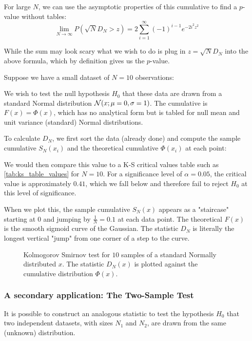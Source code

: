 For large $N$, we can use the asymptotic properties of this cumulative to find a $p$-value without tables:
	\[
	\lim_{N\to\infty} P\left(\sqrt{N}D_N>z\right) = 2\sum_{i=1}^\infty \left(-1\right)^{i-1}e^{-2i^2z^2}
	\]

While the sum may look scary what we wish to do is plug in $z= \sqrt{N}D_N$ into the above formula, which by definition gives us the $p$-value.

\begin{example}
	Suppose we have a small dataset of $N=10$ observations:
	
	
		
	We wish to test the null hypothesis $H_0$ that these data are drawn from a standard Normal distribution $\mathcal{N}(x;\mu=0, \sigma=1)$. The cumulative is $F(x) = \Phi(x)$, which has no analytical form but is tabled for null mean and unit variance (standard) Normal distributions.

	To calculate $D_N$, we first sort the data (already done) and compute the sample cumulative $S_N(x_i)$ and the theoretical cumulative $\Phi(x_i)$ at each point:
	
	
	
	We would then compare this value to a K-S critical values table such as \ref{tab:ks_table_values} for $N=10$. For a significance level of $\alpha = 0.05$, the critical value is approximately $0.41$, which we fall below and therefore fail to reject $H_0$ at this level of significance.\sidenotemark
	
	When we plot this, the sample cumulative $S_N(x)$ appears as a "staircase" starting at 0 and jumping by $\frac{1}{N} = 0.1$ at each data point. The theoretical $F(x)$ is the smooth sigmoid curve of the Gaussian. The statistic $D_N$ is literally the longest vertical "jump" from one corner of a step to the curve.
	
	\begin{figure}[H]
		\centering
		
		\caption{Kolmogorov Smirnov test for $10$ samples of a standard Normally distributed $x$. The statistic $D_N(x)$ is plotted against the cumulative distribution $\Phi(x)$.}
		\label{fig:ks_example}
	\end{figure}
\end{example}


\subsubsection{A secondary application: The Two-Sample Test}
It is possible to construct an analogous statistic to test the hypothesis $H_0$ that two independent datasets, with sizes $N_1$ and $N_2$, are drawn from the same (unknown) distribution.

